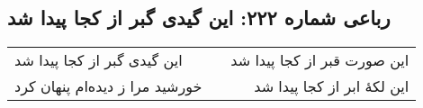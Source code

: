 \begin{center}
\section*{رباعی شماره ۲۲۲: این گیدی گبر از کجا پیدا شد}
\label{sec:sh222}
\begin{longtable}{l p{0.5cm} r}
این گیدی گبر از کجا پیدا شد
&&
این صورت قبر از کجا پیدا شد
\\
خورشید مرا ز دیده‌ام پنهان کرد
&&
این لکهٔ ابر از کجا پیدا شد
\\
\end{longtable}
\end{center}
